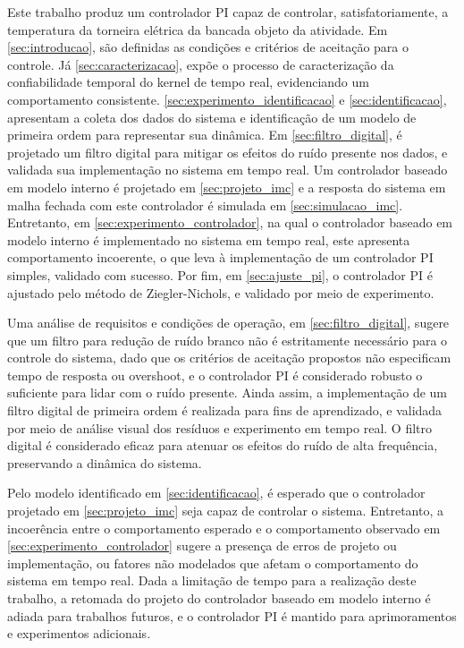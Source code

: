 \documentclass[conference,harvard,brazil,english]{sbatex}
\begin{document}
Este trabalho produz um controlador PI capaz de controlar, satisfatoriamente, a temperatura da torneira elétrica da bancada objeto da atividade. Em \ref{sec:introducao}, são definidas as condições e critérios de aceitação para o controle. Já \ref{sec:caracterizacao}, expõe o processo de caracterização da confiabilidade temporal do kernel de tempo real, evidenciando um comportamento consistente. \ref{sec:experimento_identificacao} e \ref{sec:identificacao}, apresentam a coleta dos dados do sistema e identificação de um modelo de primeira ordem para representar sua dinâmica. Em \ref{sec:filtro_digital}, é projetado um filtro digital para mitigar os efeitos do ruído presente nos dados, e validada sua implementação no sistema em tempo real. Um controlador baseado em modelo interno é projetado em \ref{sec:projeto_imc} e a resposta do sistema em malha fechada com este controlador é simulada em \ref{sec:simulacao_imc}. Entretanto, em \ref{sec:experimento_controlador}, na qual o controlador baseado em modelo interno é implementado no sistema em tempo real, este apresenta comportamento incoerente, o que leva à implementação de um controlador PI simples, validado com sucesso. Por fim, em \ref{sec:ajuste_pi}, o controlador PI é ajustado pelo método de Ziegler-Nichols, e validado por meio de experimento.

Uma análise de requisitos e condições de operação, em \ref{sec:filtro_digital}, sugere que um filtro para redução de ruído branco não é estritamente necessário para o controle do sistema, dado que os critérios de aceitação propostos não especificam tempo de resposta ou overshoot, e o controlador PI é considerado robusto o suficiente para lidar com o ruído presente. Ainda assim, a implementação de um filtro digital de primeira ordem é realizada para fins de aprendizado, e validada por meio de análise visual dos resíduos e experimento em tempo real. O filtro digital é considerado eficaz para atenuar os efeitos do ruído de alta frequência, preservando a dinâmica do sistema.

Pelo modelo identificado em \ref{sec:identificacao}, é esperado que o controlador projetado em \ref{sec:projeto_imc} seja capaz de controlar o sistema. Entretanto, a incoerência entre o comportamento esperado e o comportamento observado em \ref{sec:experimento_controlador} sugere a presença de erros de projeto ou implementação, ou fatores não modelados que afetam o comportamento do sistema em tempo real. Dada a limitação de tempo para a realização deste trabalho, a retomada do projeto do controlador baseado em modelo interno é adiada para trabalhos futuros, e o controlador PI é mantido para aprimoramentos e experimentos adicionais.
\end{document}

